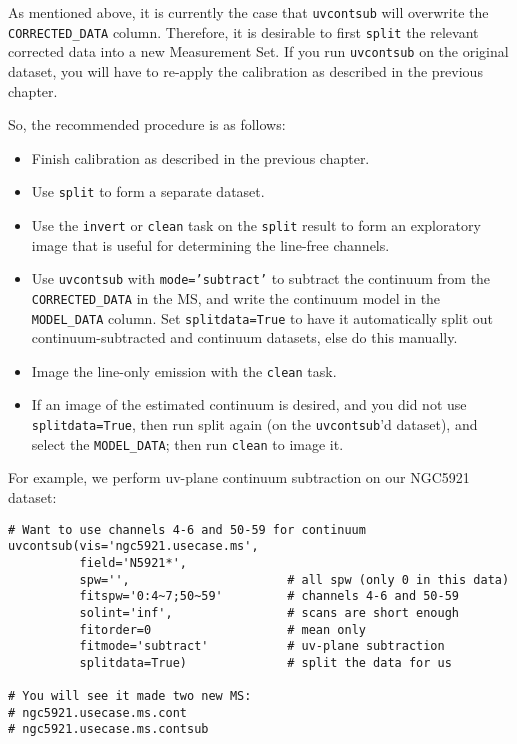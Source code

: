 As mentioned above, it is currently the case that {\tt uvcontsub} will
overwrite the {\tt CORRECTED\_DATA} column. Therefore, it is desirable
to first {\tt split} the relevant corrected data into a new Measurement Set.  
If you run {\tt uvcontsub} on the original dataset, you will
have to re-apply the calibration as described in the previous chapter.

So, the recommended procedure is as follows: 
\begin{itemize}
   \item Finish calibration as described in the previous chapter.
   \item Use {\tt split} to form a separate dataset.
   \item Use the {\tt invert} or {\tt clean} task on the {\tt split}
         result to form an exploratory image that is useful for
         determining the line-free channels.
   \item Use {\tt uvcontsub} with {\tt mode='subtract'} to subtract
         the continuum from the {\tt CORRECTED\_DATA} in the MS,
         and write the continuum model in the {\tt MODEL\_DATA} column.
         Set {\tt splitdata=True} to have it automatically split out
         continuum-subtracted and continuum datasets, else do this 
         manually.         
   \item Image the line-only emission with the {\tt clean} task.
   \item If an image of the estimated continuum is desired, and
         you did not use {\tt splitdata=True}, then run split
         again (on the {\tt uvcontsub}'d dataset), and select the 
         {\tt MODEL\_DATA}; then run {\tt clean} to image it.
\end{itemize}

For example, we perform uv-plane continuum subtraction on our
NGC5921 dataset:
\small
\begin{verbatim}
# Want to use channels 4-6 and 50-59 for continuum
uvcontsub(vis='ngc5921.usecase.ms',
          field='N5921*',
          spw='',                      # all spw (only 0 in this data)
          fitspw='0:4~7;50~59'         # channels 4-6 and 50-59
          solint='inf',                # scans are short enough
          fitorder=0                   # mean only
          fitmode='subtract'           # uv-plane subtraction
          splitdata=True)              # split the data for us

# You will see it made two new MS:
# ngc5921.usecase.ms.cont
# ngc5921.usecase.ms.contsub
\end{verbatim}
\normalsize

